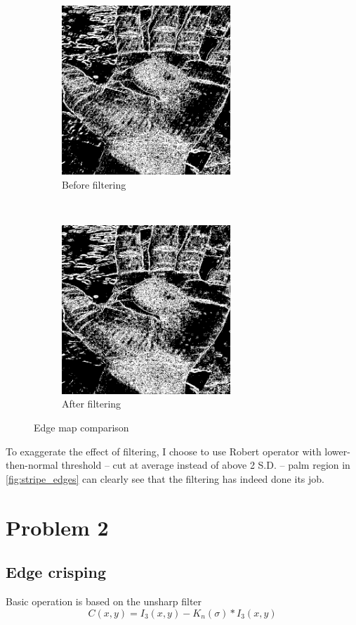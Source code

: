 \documentclass[12pt]{article}
\begin{document}
\begin{figure}[H]
    \centering
    \begin{subfigure}[t]{0.5\textwidth}
        \centering
        \includegraphics[height=2.5in]{images/stripe_before_edge}
        \caption{Before filtering}
    \end{subfigure}%
    ~
    \begin{subfigure}[t]{0.5\textwidth}
        \centering
        \includegraphics[height=2.5in]{images/stripe_after_edge}
        \caption{After filtering}
    \end{subfigure}
    \caption{Edge map comparison}
    \label{fig:stripe_edges}
\end{figure}

To exaggerate the effect of filtering, I choose to use Robert operator with lower-then-normal threshold -- cut at average instead of above 2 S.D. -- palm region in \autoref{fig:stripe_edges} can clearly see that the filtering has indeed done its job.

\section*{Problem 2}
\subsection*{Edge crisping}
Basic operation is based on the unsharp filter
\begin{equation}
	C(x, y) = I_3(x, y) - K_n(\sigma) \ast I_3(x, y)
\end{equation}
\end{document}
